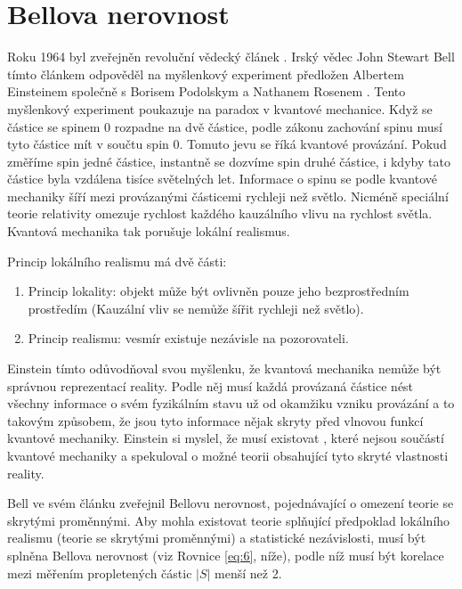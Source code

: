 \section{Bellova nerovnost}

Roku 1964 byl zveřejněn revoluční vědecký článek \parencite{bellineq}. Irský vědec John Stewart Bell tímto článkem odpověděl na myšlenkový experiment předložen Albertem Einsteinem společně s Borisem Podolskym a Nathanem Rosenem \parencite*{eprpar}. Tento myšlenkový experiment poukazuje na paradox v kvantové mechanice. Když se částice se spinem 0 rozpadne na dvě částice, podle zákonu zachování spinu musí tyto částice mít v součtu spin 0. Tomuto jevu se říká kvantové provázání. Pokud změříme spin jedné částice, instantně se dozvíme spin druhé částice, i kdyby tato částice byla vzdálena tisíce světelných let. Informace o spinu se podle kvantové mechaniky šíří mezi provázanými částicemi rychleji než světlo. Nicméně speciální teorie relativity omezuje rychlost každého kauzálního vlivu na rychlost světla. Kvantová mechanika tak porušuje lokální realismus.

Princip lokálního realismu má dvě části:
    \begin{enumerate}
        \item Princip lokality: objekt může být ovlivněn pouze jeho bezprostředním prostředím (Kauzální vliv se nemůže šířit rychleji než světlo). \parencite{lokalita}
        \item Princip realismu: vesmír existuje nezávisle na pozorovateli. \parencite{realismus}
    \end{enumerate}
    
Einstein tímto odůvodňoval svou myšlenku, že kvantová mechanika nemůže být správnou reprezentací reality. Podle něj musí každá provázaná částice nést všechny informace o svém fyzikálním stavu už od okamžiku vzniku provázání a to takovým způsobem, že jsou tyto informace nějak skryty před vlnovou funkcí kvantové mechaniky. Einstein si myslel, že musí existovat , které nejsou součástí kvantové mechaniky a spekuloval o možné teorii obsahující tyto skryté vlastnosti reality.

Bell ve svém článku \parencite*{bellineq} zveřejnil Bellovu nerovnost, pojednávající o omezení teorie se skrytými proměnnými. Aby mohla existovat teorie splňující předpoklad lokálního realismu (teorie se skrytými proměnnými) a statistické nezávislosti, musí být splněna Bellova nerovnost (viz Rovnice \ref{eq:6}, níže), podle níž musí být korelace mezi měřením propletených částic $|S|$ menší než 2.

